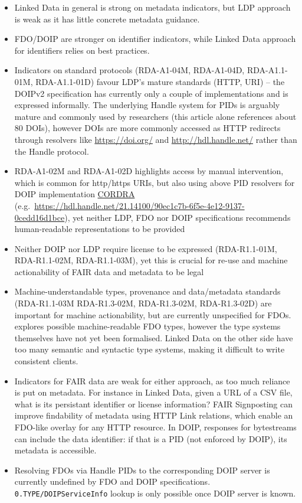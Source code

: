 \documentclass[fleqn,10pt,NOlineno]{wlpeerjlua}
\providecommand{\tightlist}{%
  \setlength{\itemsep}{0pt}\setlength{\parskip}{0pt}}
\begin{document}
\begin{itemize}
\tightlist
\item
  Linked Data in general is strong on metadata indicators, but LDP approach is weak as it has little concrete metadata guidance.
\item
  FDO/DOIP are stronger on identifier indicators, while Linked Data approach for identifiers relies on best practices. 
\item
  Indicators on standard protocols (RDA-A1-04M, RDA-A1-04D, RDA-A1.1-01M, RDA-A1.1-01D) favour LDP's mature standards (HTTP, URI) -- the DOIPv2 specification \autocite{foundationDigitalObjectInterface} has currently only a couple of implementations and is expressed informally. The underlying Handle system for PIDs is arguably mature and commonly used by researchers (this article alone references about 80 DOIs), however DOIs are more commonly accessed as HTTP redirects through resolvers like \url{https://doi.org/} and \url{http://hdl.handle.net/} rather than the Handle protocol.
\item
  RDA-A1-02M and RDA-A1-02D highlights access by manual intervention, which is common for http/https URIs, but also using above PID resolvers for DOIP implementation \href{https://www.cordra.org/}{CORDRA} (e.g.~\url{https://hdl.handle.net/21.14100/90ec1c7b-6f5e-4e12-9137-0cedd16d1bce}), yet neither LDP, FDO nor DOIP specifications recommends human-readable representations to be provided
\item
  Neither DOIP nor LDP require license to be expressed (RDA-R1.1-01M, RDA-R1.1-02M, RDA-R1.1-03M), yet this is crucial for re-use and machine actionability of FAIR data and metadata to be legal
\item
  Machine-understandable types, provenance and data/metadata standards (RDA-R1.1-03M RDA-R1.3-02M, RDA-R1.3-02M, RDA-R1.3-02D) are important for machine actionability, but are currently unspecified for FDOs. \autocite{fdo-ImplAttributesTypesProfiles} explores possible machine-readable FDO types, however the type systems themselves have not yet been formalised. Linked Data on the other side have too many semantic and syntactic type systems, making it difficult to write consistent clients.
\item
  Indicators for FAIR data are weak for either approach, as too much reliance is put on metadata. For instance in Linked Data, given a URL of a CSV file, what is its persistant identifier or license information? FAIR Signposting \autocite{vandesompelFAIRSignpostingProfile2022} can improve findability of metadata using HTTP Link relations, which enable an FDO-like overlay for any HTTP resource. In DOIP, responses for bytestreams can include the data identifier: if that is a PID (not enforced by DOIP), its metadata is accessible.
\item
  Resolving FDOs via Handle PIDs to the corresponding DOIP server is currently undefined by FDO and DOIP specifications. \texttt{0.TYPE/DOIPServiceInfo} lookup is only possible once DOIP server is known.
\end{itemize}
\end{document}
